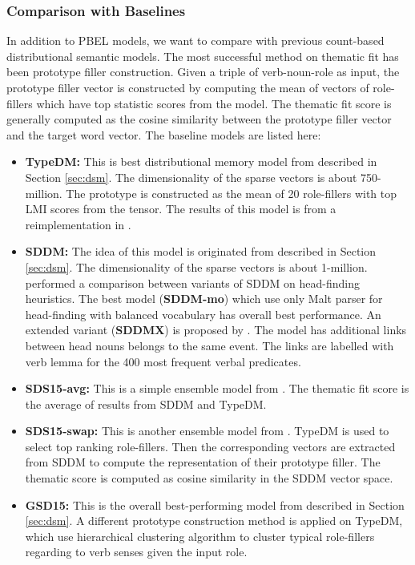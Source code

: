 \documentclass[a4paper]{article}
\begin{document}
\subsubsection{Comparison with Baselines} \label{sec:result-thematic}
In addition to PBEL models, we want to compare with previous count-based distributional semantic models. The most successful method on thematic fit has been prototype filler construction. Given a triple of verb-noun-role as input, the prototype filler vector is constructed by computing the mean of vectors of role-fillers which have top statistic scores from the model. The thematic fit score is generally computed as the cosine similarity between the prototype filler vector and the target word vector. The baseline models are listed here: 
\begin{itemize}
  \item \textbf{TypeDM: }   This is best distributional memory model from \citet{baroni2010distributional} described in Section \ref{sec:dsm}.  The dimensionality of the sparse vectors is about 750-million. The prototype is constructed as the mean of 20 role-fillers with top LMI scores from the tensor. The results of this model is from a reimplementation in \citet{greenberg2015improving}. 
  \item \textbf{SDDM: } The idea of this model is originated from \citet{sayeed2014combining} described in Section \ref{sec:dsm}. The dimensionality of the sparse vectors is about 1-million. \citet{sayeed2015exploration} performed a comparison between variants of SDDM on head-finding heuristics. The best model (\textbf{SDDM-mo}) which use only Malt parser for head-finding with balanced vocabulary has overall best performance. An extended variant (\textbf{SDDMX}) is proposed by \citet{greenberg2015improving}. The model has additional links between head nouns belongs to the same event. The links are labelled with verb lemma for the 400 most frequent verbal predicates. 
  \item \textbf{SDS15-avg: }    This is a simple ensemble model from \citet{sayeed2015exploration}. The thematic fit score is the average of results from SDDM and TypeDM. 
  \item \textbf{SDS15-swap: }   This is another ensemble model from \citet{sayeed2015exploration}. TypeDM is used to select top ranking role-fillers. Then the corresponding vectors are extracted from SDDM to compute the representation of their prototype filler. The thematic score is computed as cosine similarity in the SDDM vector space. 
  \item \textbf{GSD15: }    This is the overall best-performing model from \citet{greenberg2015improving} described in Section \ref{sec:dsm}. A different prototype construction method is applied on TypeDM, which use hierarchical clustering algorithm to cluster typical role-fillers regarding to verb senses given the input role. 

\end{itemize}
\end{document}
